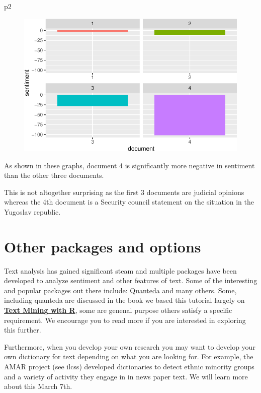 \documentclass[
  letterpaper,
  DIV=11,
  numbers=noendperiod]{scrartcl}
\newenvironment{Shaded}{\begin{snugshade}}{\end{snugshade}}
\newcommand{\NormalTok}[1]{\textcolor[rgb]{0.00,0.23,0.31}{#1}}
\begin{document}
\begin{Shaded}
\begin{Highlighting}[]
\NormalTok{p2}
\end{Highlighting}
\end{Shaded}

\begin{figure}[H]

{\centering \includegraphics{working_with_text1_files/figure-pdf/unnamed-chunk-19-1.pdf}

}

\end{figure}

As shown in these graphs, document 4 is significantly more negative in
sentiment than the other three documents.

This is not altogether surprising as the first 3 documents are judicial
opinions whereas the 4th document is a Security council statement on the
situation in the Yugoslav republic.

\hypertarget{other-packages-and-options}{%
\section{Other packages and options}\label{other-packages-and-options}}

Text analysis has gained significant steam and multiple packages have
been developed to analyze sentiment and other features of text. Some of
the interesting and popular packages out there include:
\href{http://quanteda.io/}{Quanteda} and many others. Some, including
quanteda are discussed in the book we based this tutorial largely on
\href{https://www.tidytextmining.com/index.html}{\textbf{Text Mining
with R}}, some are genenal purpose others satisfy a specific
requirement. We encourage you to read more if you are interested in
exploring this further.

Furthermore, when you develop your own research you may want to develop
your own dictionary for text depending on what you are looking for. For
example, the AMAR project (see ilcss) developed dictionaries to detect
ethnic minority groups and a variety of activity they engage in in news
paper text. We will learn more about this March 7th.
\end{document}
